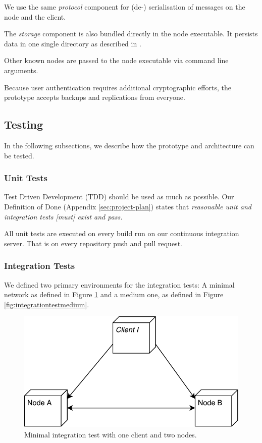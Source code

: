 We use the same \emph{protocol} component for (de-) serialisation of messages on the \gls{node} and the \gls{client}.

The \emph{storage} component is also bundled directly in the \gls{node} executable. It persists data in one single directory as described in .

Other known \glspl{node} are passed to the \gls{node} executable via command line arguments.

Because user authentication requires additional cryptographic efforts, the prototype accepts backups and replications from everyone.

\subsection{Testing}\label{testing}

In the following subsections, we describe how the prototype and architecture can be tested.

\subsubsection{Unit Tests}\label{unit-tests}
Test Driven Development (TDD) \cite{TDD} should be used as much as possible. Our Definition of Done (Appendix \ref{sec:project-plan}) states that \emph{reasonable unit and integration tests [must] exist and pass.}

All unit tests are executed on every build run on our continuous integration server. That is on every repository push and pull request.

\subsubsection{Integration Tests}\label{integration-tests}

We defined two primary environments for the integration tests: A minimal network as defined in Figure \ref{fig:integrationtestsmall} and a medium one, as defined in Figure \ref{fig:integrationtestmedium}.

\begin{figure}
	\centering
	\includegraphics[width=0.5\linewidth]{resources/integration_test_small}
	\caption[Minimal integration test]{Minimal integration test with one \gls{client} and two \glspl{node}.}
	\label{fig:integrationtestsmall}
\end{figure}

